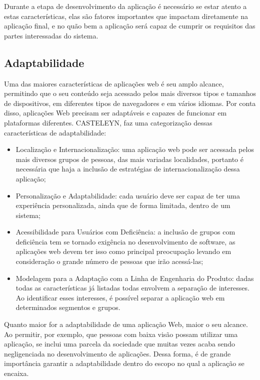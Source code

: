 Durante a etapa de desenvolvimento da aplicação é necessário se estar atento a estas características, elas são fatores importantes que impactam diretamente na aplicação final, e no quão bem a aplicação será capaz de cumprir os requisitos das partes interessadas do sistema.

\subsection{Adaptabilidade}

Uma das maiores características de aplicações web é seu amplo alcance, permitindo que o seu conteúdo seja acessado pelos mais diversos tipos e tamanhos de dispositivos, em diferentes tipos de navegadores e em vários idiomas. Por conta disso, aplicações Web precisam ser adaptáveis e capazes de funcionar em plataformas diferentes. CASTELEYN, faz uma categorização dessas características de adaptabilidade:

\begin{itemize}
    \item Localização e Internacionalização: uma aplicação web pode ser acessada pelos mais diversos grupos de pessoas, das mais variadas localidades, portanto é necessária que haja a inclusão de estratégias de internacionalização dessa aplicação;
    \item Personalização e Adaptabilidade: cada usuário deve ser capaz de ter uma experiência personalizada, ainda que de forma limitada, dentro de um sistema;
    \item Acessibilidade para Usuários com Deficiência: a inclusão de grupos com deficiência tem se tornado exigência no desenvolvimento de software, as aplicações web devem ter isso como principal preocupação levando em consideração o grande número de pessoas que irão acessá-las;
    \item Modelagem para a Adaptação com a Linha de Engenharia do Produto: dadas todas as características já listadas todas envolvem a separação de interesses. Ao identificar esses interesses, é possível separar a aplicação web em determinados segmentos e grupos.
\end{itemize}

Quanto maior for a adaptabilidade de uma aplicação Web, maior o seu alcance. Ao permitir, por exemplo, que pessoas com baixa visão possam utilizar uma aplicação, se inclui uma parcela da sociedade que muitas vezes acaba sendo negligenciada no desenvolvimento de aplicações. Dessa forma, é de grande importância garantir a adaptabilidade dentro do escopo no qual a aplicação se encaixa.


